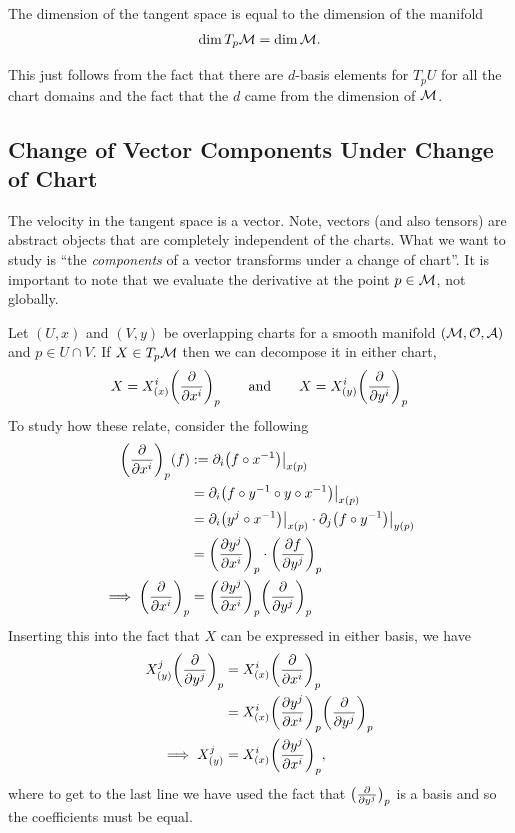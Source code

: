 \documentclass[12pt]{article} %
\newcommand{\boxx}[1]{\noindent\fbox{%
    \parbox{\textwidth}{%
        	#1
    }%
}}
\begin{document}
\bc 
    The dimension of the tangent space is equal to the dimension of the manifold
    \begin{align*} 
        \dim T_p\mathcal{M} = \dim \mathcal{M}.
    \end{align*} 
\ec 

\bq 
    This just follows from the fact that there are $d$-basis elements for $T_pU$ for all the chart domains and the fact that the $d$ came from the dimension of $\mathcal{M}$. 
\eq 

\subsection{Change of Vector Components Under Change of Chart}
The velocity in the tangent space is a vector. Note, vectors (and also tensors) are abstract objects that are completely independent of the charts.  What we want to study is ``the \textit{components} of a vector transforms under a change of chart''.  
It is important to note that we evaluate the derivative at the point $p\in\mathcal{M}$, not globally.

Let $(U,x)$ and $(V,y)$ be overlapping charts for a smooth manifold $(\mathcal{M},\mathcal{O},\mathcal{A})$ and $p\in U\cap V$. If $X\in T_p\mathcal{M}$ then we can decompose it in either chart, 
\begin{align*} 
    X = X^i_{(x)} \bigg(\frac{\partial}{\partial x^i}\bigg)_p \qquad \text{and} \qquad X = X^i_{(y)} \bigg(\frac{\partial}{\partial y^i}\bigg)_p 
\end{align*} 
To study how these relate, consider the following
\begin{align} 
        \bigg(\frac{\partial}{\partial x^i}\bigg)_p (f )& := \partial_i \big(f\circ x^{-1}\big)\big|_{x(p)} \nonumber\\ 
        & = \partial_i\big(f\circ y^{-1}\circ y \circ  x^{-1}\big)\big|_{x(p)} \nonumber\\ 
        & = \partial_i \big( y^j \circ x^{-1}\big)\big|_{x(p)} \cdot \partial_j \big( f\circ y^{-1}\big)\big|_{y(p)} \nonumber\\ 
        & = \bigg(\frac{\partial y^j}{\partial x^i}\bigg)_p \cdot \bigg(\frac{\partial f}{\partial y^j}\bigg)_p \nonumber\\ 
        \implies \bigg(\frac{\partial}{\partial x^i}\bigg)_p  & = \bigg(\frac{\partial y^j}{\partial x^i}\bigg)_p \bigg(\frac{\partial }{\partial y^j}\bigg)_p\label{eq:dfadf}
\end{align} 
Inserting this into the fact that $X$ can be expressed in either basis, we have 
\begin{align} 
        X^j_{(y)} \bigg(\frac{\partial}{\partial y^j}\bigg)_p & =  X^i_{(x)} \bigg(\frac{\partial}{\partial x^i}\bigg)_p \nonumber\\ 
        & = X^i_{(x)} \bigg(\frac{\partial y^j}{\partial x^i}\bigg)_p  \bigg(\frac{\partial }{\partial y^j}\bigg)_p \nonumber\\ 
        \implies X^j_{(y)} & = X^i_{(x)} \bigg(\frac{\partial y^j}{\partial x^i}\bigg)_p,
\end{align} 
where to get to the last line we have used the fact that $\big(\frac{\partial}{\partial y^j}\big)_p$ is a basis and so the coefficients must be equal.
\end{document}
